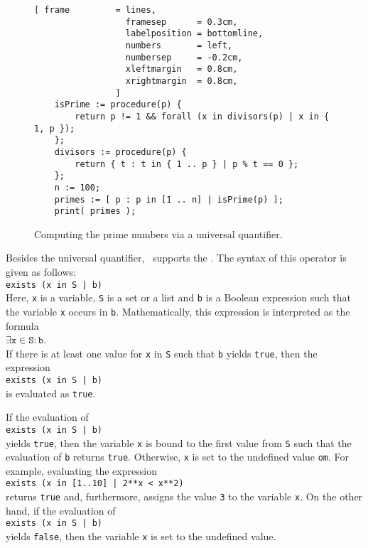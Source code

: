 \begin{figure}[!ht]
\centering
\begin{Verbatim}[ frame         = lines, 
                  framesep      = 0.3cm, 
                  labelposition = bottomline,
                  numbers       = left,
                  numbersep     = -0.2cm,
                  xleftmargin   = 0.8cm,
                  xrightmargin  = 0.8cm,
                ]
    isPrime := procedure(p) {
        return p != 1 && forall (x in divisors(p) | x in { 1, p });
    };
    divisors := procedure(p) {
        return { t : t in { 1 .. p } | p % t == 0 };
    };
    n := 100;
    primes := [ p : p in [1 .. n] | isPrime(p) ];
    print( primes );
\end{Verbatim}
\vspace*{-0.3cm}
\caption{Computing the prime numbers via a universal quantifier.}
\label{fig:primes-forall.stlx}
\end{figure}

Besides the universal quantifier, \setlx\ supports the .  The syntax of this operator is
given as follows: 
\\[0.2cm]
\hspace*{1.3cm}
\texttt{exists (x in S | b)}
\\[0.2cm]
Here, \texttt{x} is a variable, \texttt{S} is a set or a list and \texttt{b} is a Boolean expression such
that the variable \texttt{x} occurs in \texttt{b}.  Mathematically, this expression is interpreted
as the formula
\\[0.2cm]
\hspace*{1.3cm}
$\exists \mathtt{x} \in \mathtt{S} : \mathtt{b}$.
\\[0.2cm]
If there is at least one value for \texttt{x} in \texttt{S} such that \texttt{b} yields \texttt{true}, 
then the expression 
\\[0.2cm]
\hspace*{1.3cm}
\texttt{exists (x in S | b)}
\\[0.2cm]
is evaluated as \texttt{true}. 

\remarkEng
If the evaluation of
\\[0.2cm]
\hspace*{1.3cm}
\texttt{exists (x in S | b)}
\\[0.2cm]
yields \texttt{true}, then the variable \texttt{x} is bound to the first value from \texttt{S} such that the
evaluation of \texttt{b} returns \texttt{true}.  Otherwise, \texttt{x} is set to the undefined value
\texttt{om}.  For example, evaluating the expression
\\[0.2cm]
\hspace*{1.3cm}
\texttt{exists (x in [1..10] | 2**x < x**2)}
\\[0.2cm]
returns \texttt{true} and, furthermore, assigns the value \texttt{3} to the variable \texttt{x}.  On the other
hand, if the evaluation of 
\\[0.2cm]
\hspace*{1.3cm}
\texttt{exists (x in S | b)}
\\[0.2cm]
yields \texttt{false}, then the variable \texttt{x} is set to the undefined value.

